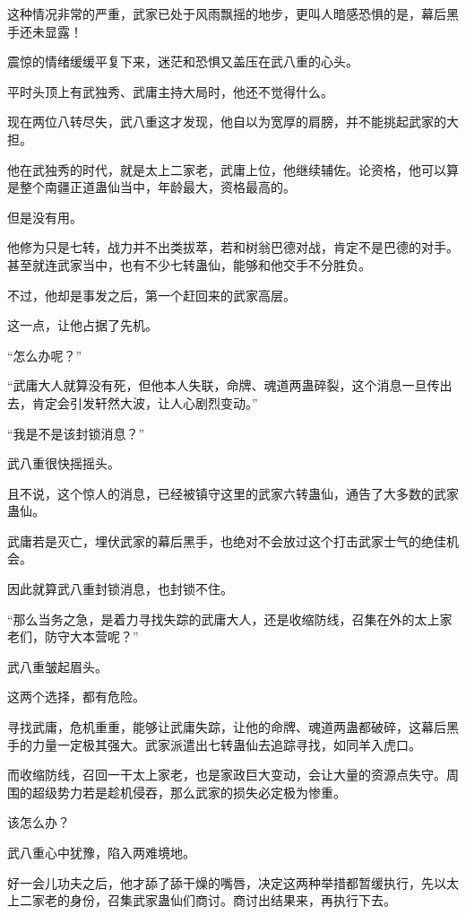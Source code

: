 \begin{this_body}
这种情况非常的严重，武家已处于风雨飘摇的地步，更叫人暗感恐惧的是，幕后黑手还未显露！

震惊的情绪缓缓平复下来，迷茫和恐惧又盖压在武八重的心头。

平时头顶上有武独秀、武庸主持大局时，他还不觉得什么。

现在两位八转尽失，武八重这才发现，他自以为宽厚的肩膀，并不能挑起武家的大担。

他在武独秀的时代，就是太上二家老，武庸上位，他继续辅佐。论资格，他可以算是整个南疆正道蛊仙当中，年龄最大，资格最高的。

但是没有用。

他修为只是七转，战力并不出类拔萃，若和树翁巴德对战，肯定不是巴德的对手。甚至就连武家当中，也有不少七转蛊仙，能够和他交手不分胜负。

不过，他却是事发之后，第一个赶回来的武家高层。

这一点，让他占据了先机。

“怎么办呢？”

“武庸大人就算没有死，但他本人失联，命牌、魂道两蛊碎裂，这个消息一旦传出去，肯定会引发轩然大波，让人心剧烈变动。”

“我是不是该封锁消息？”

武八重很快摇摇头。

且不说，这个惊人的消息，已经被镇守这里的武家六转蛊仙，通告了大多数的武家蛊仙。

武庸若是灭亡，埋伏武家的幕后黑手，也绝对不会放过这个打击武家士气的绝佳机会。

因此就算武八重封锁消息，也封锁不住。

“那么当务之急，是着力寻找失踪的武庸大人，还是收缩防线，召集在外的太上家老们，防守大本营呢？”

武八重皱起眉头。

这两个选择，都有危险。

寻找武庸，危机重重，能够让武庸失踪，让他的命牌、魂道两蛊都破碎，这幕后黑手的力量一定极其强大。武家派遣出七转蛊仙去追踪寻找，如同羊入虎口。

而收缩防线，召回一干太上家老，也是家政巨大变动，会让大量的资源点失守。周围的超级势力若是趁机侵吞，那么武家的损失必定极为惨重。

该怎么办？

武八重心中犹豫，陷入两难境地。

好一会儿功夫之后，他才舔了舔干燥的嘴唇，决定这两种举措都暂缓执行，先以太上二家老的身份，召集武家蛊仙们商讨。商讨出结果来，再执行下去。


\end{this_body}
